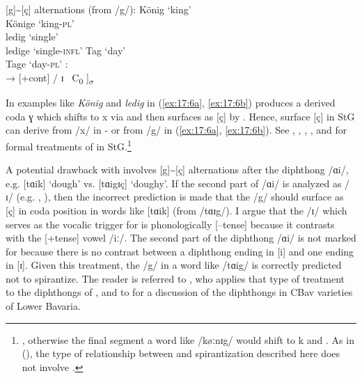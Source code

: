\ea%
\label{ex:17:6}[g]{\textasciitilde}[ç] alternations (from /g/):
 \ea \label{ex:17:6a}
\relax [køːnɪç] \tab König \tab ‘king’\\
\relax [køːnɪgə] \tab Könige \tab ‘king-\textsc{pl}’\\
\ex\label{ex:17:6b}
\relax [leːdɪç] \tab ledig \tab ‘single’\\
\relax [leːdɪgə] \tab ledige \tab ‘single\textsc{{}-infl}’
\ex \label{ex:17:6c}
\relax [tɑk] \tab Tag \tab ‘day’\\
\relax [tɑigə] \tab Tage \tab ‘day-\textsc{pl}’
    \z
\ex%
\label{ex:17:7}:\smallskip\\
  → [+cont] / ɪ {\longrule}\ C\textsubscript{0} ]\textsubscript{${\sigma}$}
\z 

In examples like \textit{König} and \textit{ledig} in (\ref{ex:17:6a}, \ref{ex:17:6b})  produces a derived coda {\textbar}ɣ{\textbar} which shifts to {\textbar}x{\textbar} via  and then surfaces as [ç] by . Hence, surface [ç] in StG can derive from /x/ in - or from /g/ in (\ref{ex:17:6a}, \ref{ex:17:6b}). See \citet[228]{Hall1992}, \citet[207; 211--212]{Wiese1996a}, \citet{Robinson2001}, \citet{ItoMester2002}, and \citet{Glover2011, Glover2014} for formal treatments of  in StG.\footnote{{  , otherwise the final segment a word like /køːnɪg/ would shift to {\textbar}k{\textbar} and  . As in  (), the type of  relationship between  and spirantization described here does not involve .} }

 A potential drawback with  involves [g]{\textasciitilde}[ç] alternations after the diphthong /ɑi/, e.g. [tɑik] ‘dough’ vs. [tɑigɪç] ‘doughy’. If the second part of /ɑi/ is analyzed as /ɪ/ (e.g. \citealt{Hall1992}, \citealt{Wiese1996a}), then the incorrect prediction is made that the /g/ should surface as [ç] in coda position in words like [tɑik] (from /tɑɪg/). I argue that the /ɪ/ which serves as the vocalic trigger for  is phonologically [--tense] because it contrasts with the [+tense] vowel /iː/. The second part of the diphthong /ɑi/ is not marked for  because there is no contrast between a diphthong ending in [i] and one ending in [ɪ]. Given this treatment, the /g/ in a word like /tɑig/ is correctly predicted not to spirantize. The reader is referred to \citet{Noelliste2017}, who applies that type of treatment to the diphthongs of , and to  for a discussion of the diphthongs in CBav varieties of Lower Bavaria.

